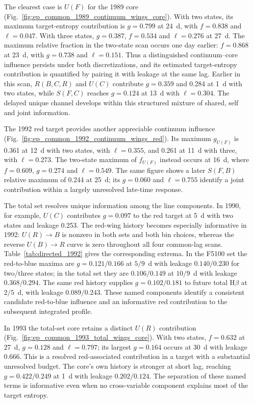 \documentclass[fleqn,usenatbib]{mnras}
\begin{document}
The clearest case is $U(F)$ for the 1989 core (Fig.~\ref{fig:ep_common_1989_continuum_wings_core}). With two states, its maximum target-entropy contribution is $g=0.799$ at 24~d, with $f=0.838$ and $\ell=0.047$. With three states, $g=0.387$, $f=0.534$ and $\ell=0.276$ at 27~d. The maximum relative fraction in the two-state scan occurs one day earlier: $f=0.868$ at 23~d, with $g=0.738$ and $\ell=0.151$. Thus a distinguished continuum--core influence persists under both discretizations, and its estimated target-entropy contribution is quantified by pairing it with leakage at the same lag. Earlier in this scan, $R(B,C,R)$ and $U(C)$ contribute $g=0.359$ and 0.284 at 1~d with two states, while $S(F,C)$ reaches $g=0.124$ at 13~d with $\ell=0.304$. The delayed unique channel develops within this structured mixture of shared, self and joint information.

The 1992 red target provides another appreciable continuum influence (Fig.~\ref{fig:ep_common_1992_continuum_wings_red}). Its maximum $g_{U(F)}$ is 0.361 at 12~d with two states, with $\ell=0.355$, and 0.261 at 11~d with three, with $\ell=0.273$. The two-state maximum of $f_{U(F)}$ instead occurs at 16~d, where $f=0.609$, $g=0.274$ and $\ell=0.549$. The same figure shows a later $S(F,B)$ relative maximum of 0.244 at 25~d; its $g=0.060$ and $\ell=0.755$ identify a joint contribution within a largely unresolved late-time response.

The total set resolves unique information among the line components. In 1990, for example, $U(C)$ contributes $g=0.097$ to the red target at 5~d with two states and leakage 0.253. The red-wing history becomes especially informative in 1992: $U(R)\to B$ is nonzero in both sets and both bin choices, whereas the reverse $U(B)\to R$ curve is zero throughout all four common-lag scans. Table~\ref{tab:directed_1992} gives the corresponding extrema. In the F5100 set the red-to-blue maxima are $g=0.121/0.166$ at $5/9$~d with leakage $0.140/0.230$ for two/three states; in the total set they are $0.106/0.149$ at $10/9$~d with leakage $0.368/0.294$. The same red history supplies $g=0.102/0.181$ to future total H$\beta$ at $2/5$~d, with leakage $0.089/0.243$. These named components identify a consistent candidate red-to-blue influence and an informative red contribution to the subsequent integrated profile.

In 1993 the total-set core retains a distinct $U(R)$ contribution (Fig.~\ref{fig:ep_common_1993_total_wings_core}). With two states, $f=0.632$ at 27~d, $g=0.128$ and $\ell=0.797$; its largest $g=0.164$ occurs at 30~d with leakage 0.666. This is a resolved red-associated contribution in a target with a substantial unresolved budget. The core's own history is stronger at short lag, reaching $g=0.422/0.249$ at 1~d with leakage $0.202/0.124$. The separation of these named terms is informative even when no cross-variable component explains most of the target entropy.
\end{document}
